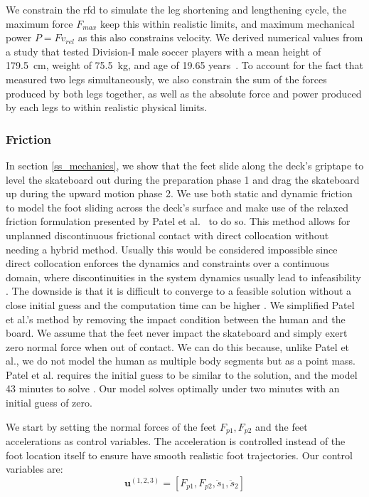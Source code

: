 \documentclass[default,iicol]{sn-jnl}
\begin{document}
We constrain the \gls{rfd} to simulate the leg shortening and lengthening cycle, the maximum force $F_{max}$ keep this within realistic limits, and maximum mechanical power $P = F v_{rel}$ as this also constrains velocity. We derived numerical values from a study that tested Division-I male soccer players with a mean height of \SI{179.5}{\centi\meter}, weight of \SI{75.5}{\kilo\gram}, and age of 19.65 years~\cite{barker_relationships_2018}. To account for the fact that \cite{barker_relationships_2018} measured two legs simultaneously, we also constrain the sum of the forces produced by both legs together, as well as the absolute force and power produced by each legs to within realistic physical limits.

\subsubsection{Friction} \label{ss_friction}
In section \ref{ss_mechanics}, we show that the feet slide along the deck's
griptape to level the skateboard out during the preparation phase 1 and drag
the skateboard up during the upward motion phase 2.
We use both static and dynamic friction to model the foot sliding across the
deck's surface and make use of the relaxed friction formulation presented by
Patel et al.~\cite{patel_contact-implicit_2019} to do so.
This method allows for unplanned discontinuous frictional contact with direct
collocation without needing a hybrid method.
Usually this would be considered impossible since direct collocation enforces
the dynamics and constraints over a continuous domain, where discontinuities in
the system dynamics usually lead to infeasibility
\cite{kelly_transcription_2017}.
The downside is that it is difficult to converge to a feasible solution without
a close initial guess and the computation time can be higher
\cite{shield_contact-implicit_2022,patel_contact-implicit_2019}.
We simplified Patel et al.'s method by removing the impact condition between
the human and the board.
We assume that the feet never impact the skateboard and simply exert zero
normal force when out of contact.
We can do this because, unlike Patel et al., we do not model the human as
multiple body segments but as a point mass.
Patel et al. requires the initial guess to be similar to the solution, and the
model 43 minutes to solve \cite{shield_contact-implicit_2022}. Our model solves
optimally under two minutes with an initial guess of zero.

We start by setting the normal forces of the feet $F_{p1},F_{p2}$ and the feet
accelerations as control variables.
The acceleration is controlled instead of the foot location itself to ensure
have smooth realistic foot trajectories.
Our control variables are:
%
\begin{equation}
    \mathbf{u}^{(1,2,3)} = [F_{p1},F_{p2},\ddot s_1, \ddot s_2]
\end{equation}
\end{document}
